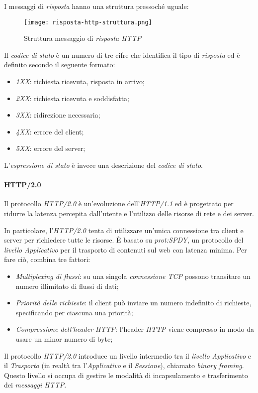 I messaggi di \emph{risposta} hanno una struttura pressoché uguale:
\begin{figure}[ht]
    \centering
    \texttt{[image: risposta-http-struttura.png]}
    \caption{Struttura messaggio di \emph{risposta HTTP}}
\end{figure}

\noindent Il \emph{codice di stato} è un numero di tre cifre che identifica il
tipo di \emph{risposta} ed è definito secondo il seguente formato:
\begin{itemize}
    \item \emph{1XX}: richiesta ricevuta, risposta in arrivo;
    \item \emph{2XX}: richiesta ricevuta e soddisfatta;
    \item \emph{3XX}: ridirezione necessaria;
    \item \emph{4XX}: errore del client;
    \item \emph{5XX}: errore del server;
\end{itemize}
L'\emph{espressione di stato} è invece una descrizione del \emph{codice di stato}.

\paragraph{HTTP/2.0}
Il protocollo \emph{HTTP/2.0} è un'evoluzione dell'\emph{HTTP/1.1} ed è progettato
per ridurre la latenza percepita dall'utente e l'utilizzo delle risorse di rete
e dei server.

In particolare, l'\emph{HTTP/2.0} tenta di utilizzare un'unica connessione
tra client e server per richiedere tutte le risorse. È basato su
\emph{\gls{prot:SPDY}}, un protocollo del \emph{livello Applicativo} per il
trasporto di contenuti sul web con latenza minima. Per fare ciò, combina tre fattori:
\begin{itemize}
    \item \emph{Multiplexing di flussi}: su una singola \emph{connessione TCP}
    possono transitare un numero illimitato di flussi di dati;
    \item \emph{Priorità delle richieste}: il client può inviare un numero
    indefinito di richieste, specificando per ciascuna una priorità;
    \item \emph{Compressione dell'header HTTP}: l'header \emph{HTTP} viene
    compresso in modo da usare un minor numero di byte;
\end{itemize}
Il protocollo \emph{HTTP/2.0} introduce un livello intermedio tra il \emph{livello
Applicativo} e il \emph{Trasporto} (in realtà tra l'\emph{Applicativo} e il
\emph{Sessione}), chiamato \emph{binary framing}. Questo livello si occupa di
gestire le modalità di incapsulamento e trasferimento dei \emph{messaggi HTTP}.

